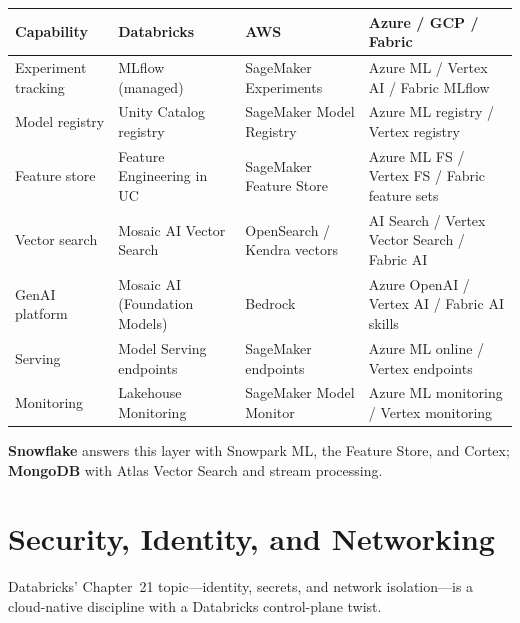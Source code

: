 \begin{center}
\footnotesize
\begin{tabular}{@{}p{3.0cm}p{3.4cm}p{3.2cm}p{3.2cm}@{}}
\toprule
\textbf{Capability} & \textbf{Databricks} & \textbf{AWS} & \textbf{Azure / GCP / Fabric} \\
\midrule
Experiment tracking & MLflow (managed) & SageMaker Experiments & Azure ML / Vertex AI / Fabric MLflow \\
Model registry & Unity Catalog registry & SageMaker Model Registry & Azure ML registry / Vertex registry \\
Feature store & Feature Engineering in UC & SageMaker Feature Store & Azure ML FS / Vertex FS / Fabric feature sets \\
Vector search & Mosaic AI Vector Search & OpenSearch / Kendra vectors & AI Search / Vertex Vector Search / Fabric AI \\
GenAI platform & Mosaic AI (Foundation Models) & Bedrock & Azure OpenAI / Vertex AI / Fabric AI skills \\
Serving & Model Serving endpoints & SageMaker endpoints & Azure ML online / Vertex endpoints \\
Monitoring & Lakehouse Monitoring & SageMaker Model Monitor & Azure ML monitoring / Vertex monitoring \\
\bottomrule
\end{tabular}
\end{center}

\noindent \textbf{Snowflake} answers this layer with Snowpark ML, the Feature Store,
and Cortex; \textbf{MongoDB} with Atlas Vector Search and stream processing.

\section{Security, Identity, and Networking}
%
Databricks' Chapter~21 topic---identity, secrets, and network isolation---is a cloud-native
discipline with a Databricks control-plane twist.

